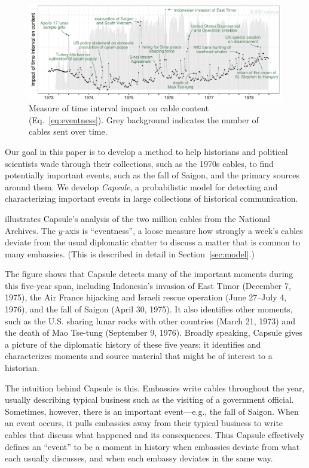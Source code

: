 \begin{figure}[ht]
\centering
\includegraphics[width=\linewidth]{fig/cables_events.pdf}
\caption{Measure of time interval impact on cable content (Eq.~\ref{eq:eventness}).  Grey background indicates the number of cables sent over time.}
\label{fig:cables_events}
\end{figure}

Our goal in this paper is to develop a method to help historians and
political scientists wade through their collections, such as the 1970s
cables, to find potentially important events, such as the fall of
Saigon, and the primary sources around them. We develop
\textit{Capsule}, a probabilistic model for detecting and
characterizing important events in large collections of historical
communication.

 illustrates Capsule's analysis of the two
million cables from the National Archives. The $y$-axis is
``eventness'', a loose measure how strongly a week's cables deviate
from the usual diplomatic chatter to discuss a matter that is common
to many embassies. (This is described in detail in Section~\ref{sec:model}.)

The figure shows that Capsule detects many of the important moments
during this five-year span, including Indonesia's invasion of East
Timor (December 7, 1975), the Air France hijacking and Israeli rescue operation
(June 27--July 4, 1976), and the fall of Saigon (April 30, 1975). It also identifies other moments,
such as the U.S. sharing lunar rocks with other countries (March 21, 1973) and
the death of Mao Tse-tung (September 9, 1976). Broadly speaking, Capsule gives a
picture of the diplomatic history of these five years; it identifies
and characterizes moments and source material that might be of
interest to a historian.

The intuition behind Capsule is this. Embassies write cables
throughout the year, usually describing typical business such as the
visiting of a government official. Sometimes, however, there is an
important event---e.g., the fall of Saigon. When an event occurs, it
pulls embassies away from their typical business to write cables that
discuss what happened and its consequences. Thus Capsule effectively
defines an ``event'' to be a moment in history when embassies deviate
from what each usually discusses, and when each embassy deviates in
the same way.

